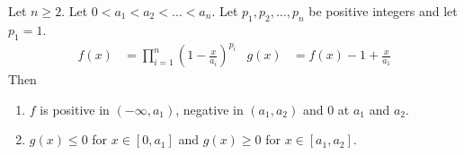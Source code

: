 \begin{theorem}
\label{thm:prod-poly}
Let $n \ge 2$. Let $0 < a_1 < a_2 < \ldots < a_n$.
Let $p_1, p_2, \ldots, p_n$ be positive integers and let $p_1 = 1$.
\begin{align*}
f(x) &= \prod_{i=1}^n \left( 1 - \frac{x}{a_i} \right)^{p_i} &
g(x) &= f(x) - 1 + \frac{x}{a_1}
\end{align*}
Then
\begin{enumerate}
\item \label{thm-part:f-val} $f$ is positive in $(-\infty, a_1)$, negative in $(a_1, a_2)$ and 0 at $a_1$ and $a_2$.
\item \label{thm-part:g-val} $g(x) \le 0$ for $x \in [0, a_1]$ and $g(x) \ge 0$ for $x \in [a_1, a_2]$.
\end{enumerate}
\end{theorem}
